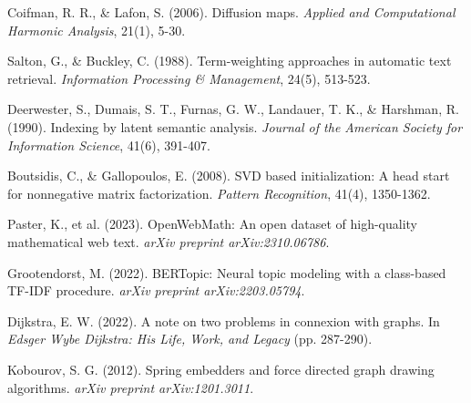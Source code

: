 \documentclass[12pt,a4paper]{article}
\begin{document}
\begin{thebibliography}{9}

Coifman, R. R., \& Lafon, S. (2006). Diffusion maps. \textit{Applied and Computational Harmonic Analysis}, 21(1), 5-30.

Salton, G., \& Buckley, C. (1988). Term-weighting approaches in automatic text retrieval. \textit{Information Processing \& Management}, 24(5), 513-523.

Deerwester, S., Dumais, S. T., Furnas, G. W., Landauer, T. K., \& Harshman, R. (1990). Indexing by latent semantic analysis. \textit{Journal of the American Society for Information Science}, 41(6), 391-407.

Boutsidis, C., \& Gallopoulos, E. (2008). SVD based initialization: A head start for nonnegative matrix factorization. \textit{Pattern Recognition}, 41(4), 1350-1362.

Paster, K., et al. (2023). OpenWebMath: An open dataset of high-quality mathematical web text. \textit{arXiv preprint arXiv:2310.06786}.

Grootendorst, M. (2022). BERTopic: Neural topic modeling with a class-based TF-IDF procedure. \textit{arXiv preprint arXiv:2203.05794}.

Dijkstra, E. W. (2022). A note on two problems in connexion with graphs. In \textit{Edsger Wybe Dijkstra: His Life, Work, and Legacy} (pp. 287-290).

Kobourov, S. G. (2012). Spring embedders and force directed graph drawing algorithms. \textit{arXiv preprint arXiv:1201.3011}.

\end{thebibliography}
\end{document}
